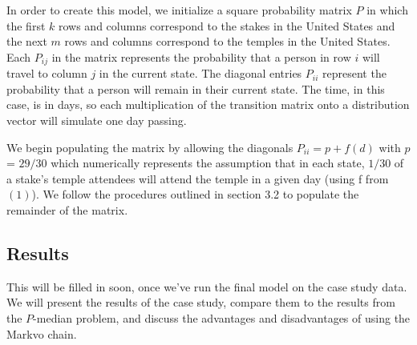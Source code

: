 \documentclass[twoside,twocolumn]{article}
\begin{document}
In order to create this model, we initialize a square probability matrix $P$ in which the first $k$ rows and columns correspond to the stakes in the United States and the next $m$ rows and columns correspond to the temples in the United States.
Each $P_{ij}$ in the matrix represents the probability that a person in row $i$ will travel to column $j$ in the current state.
The diagonal entries $P_{ii}$ represent the probability that a person will remain in their current state.
The time, in this case, is in days, so each multiplication of the transition matrix onto a distribution vector will simulate one day passing.


We begin populating the matrix by allowing the diagonals $P_{ii} = p + f(d)$ with $p$ = $29/30$ which numerically represents the assumption that in each state, $1/30$ of a stake's temple attendees will attend the temple in a given day (using f from $(1)$).
We follow the procedures outlined in section 3.2 to populate the remainder of the matrix.


\subsection{Results}

This will be filled in soon, once we've run the final model on the case study data.
We will present the results of the case study, compare them to the results from the $P$-median problem, and discuss the advantages and disadvantages of using the Markvo chain.




\end{document}
